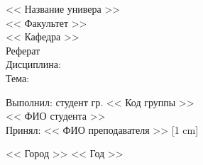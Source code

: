 \begin{center} 

\large << Название универа >>\\[2.5cm] 

<< Факультет >>\\[0.2cm]

<< Кафедра >>\\[1 cm]

\huge Реферат \\[0.6cm] %
\large Дисциплина: \\
\large Тема: \\[5cm]

\end{center} 

\begin{flushright}
Выполнил: студент гр. << Код группы >>\\
<< ФИО студента >> \\[1 cm]

Принял: << ФИО преподавателя >> [1 cm]

\end{flushright}


\vfill 

\begin{center} 
\large << Город >> << Год >>
\end{center} 

\thispagestyle{empty}